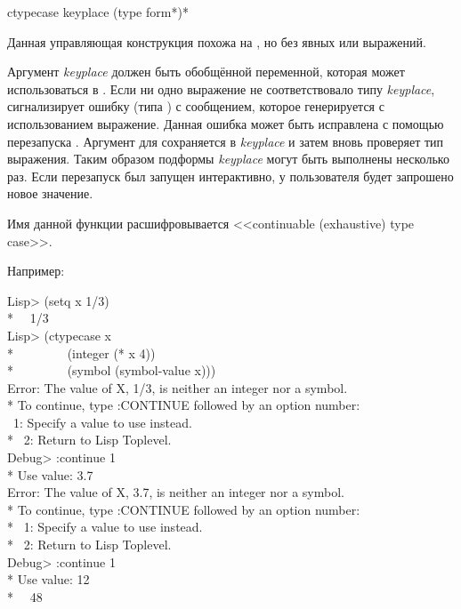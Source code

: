 \begin{defmac}
ctypecase keyplace {(type {form}*)}*

Данная управляющая конструкция похожа на , но без явных
 или  выражений.

Аргумент \emph{keyplace} должен быть обобщённой переменной, которая может
использоваться в . Если ни одно выражение не соответствовало типу
\emph{keyplace},  сигнализирует ошибку (типа ) с
сообщением, которое генерируется с использованием выражение. Данная ошибка может
быть исправлена с помощью перезапуска . Аргумент
для  сохраняется в \emph{keyplace} и затем 
вновь проверяет тип выражения. Таким образом подформы \emph{keyplace} могут быть
выполнены несколько раз. Если перезапуск  был запущен
интерактивно, у пользователя будет запрошено новое значение.

Имя данной функции расшифровывается <<continuable (exhaustive) type
case>>.

Например:
\begin{lisp}
Lisp> (setq x 1/3) \\*
~\EV\ 1/3 \\
Lisp> (ctypecase x \\*
~~~~~~~~(integer (* x 4)) \\*
~~~~~~~~(symbol (symbol-value x))) \\
Error: The value of X, 1/3, is neither an integer nor a symbol. \\*
To continue, type :CONTINUE followed by an option number: \\
~1: Specify a value to use instead. \\*
~2: Return to Lisp Toplevel. \\
Debug> :continue 1 \\*
Use value: 3.7 \\
Error: The value of X, 3.7, is neither an integer nor a symbol. \\*
To continue, type :CONTINUE followed by an option number: \\*
~1: Specify a value to use instead. \\*
~2: Return to Lisp Toplevel. \\
Debug> :continue 1 \\*
Use value: 12 \\*
~\EV\ 48
\end{lisp}
\end{defmac}


